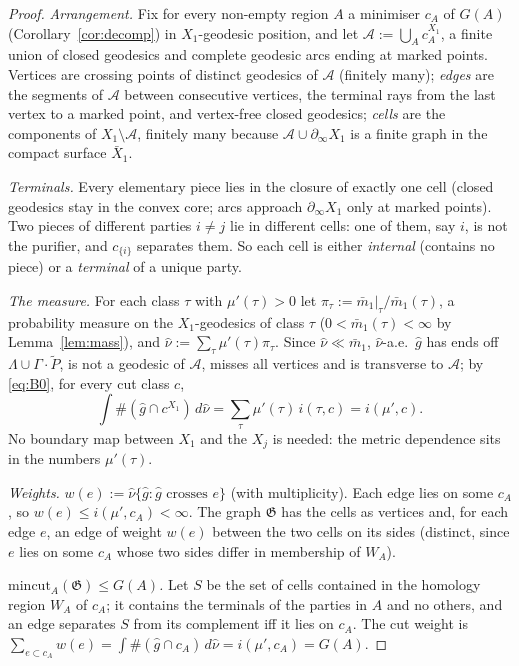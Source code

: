 \documentclass[aps,prd,onecolumn,superscriptaddress,nofootinbib,amsmath,amssymb,11pt]{revtex4-2}
\theoremstyle{definition}
\newcommand{\mbar}{\bar m}
\newcommand{\Pt}{\tilde P}
\begin{document}
\begin{proof}
\emph{Arrangement.} Fix for every non-empty region $A$ a minimiser $c_A$ of $G(A)$ (Corollary~\ref{cor:decomp}) in
$X_1$-geodesic position, and let $\mathcal A:=\bigcup_Ac_A^{X_1}$, a finite union of closed geodesics and complete
geodesic arcs ending at marked points. Vertices are crossing points of distinct geodesics of $\mathcal A$ (finitely
many); \emph{edges} are the segments of $\mathcal A$ between consecutive vertices, the terminal rays from the last
vertex to a marked point, and vertex-free closed geodesics; \emph{cells} are the components of $X_1\setminus\mathcal A$,
finitely many because $\mathcal A\cup\partial_\infty X_1$ is a finite graph in the compact surface $\bar X_1$.

\emph{Terminals.} Every elementary piece lies in the closure of exactly one cell (closed geodesics stay in the convex
core; arcs approach $\partial_\infty X_1$ only at marked points). Two pieces of different parties $i\ne j$ lie in
different cells: one of them, say $i$, is not the purifier, and $c_{\{i\}}$ separates them. So each cell is either
\emph{internal} (contains no piece) or a \emph{terminal} of a unique party.

\emph{The measure.} For each class $\tau$ with $\mu'(\tau)>0$ let $\pi_\tau:=\mbar_1|_\tau/\mbar_1(\tau)$, a probability
measure on the $X_1$-geodesics of class $\tau$ ($0<\mbar_1(\tau)<\infty$ by Lemma~\ref{lem:mass}), and
$\hat\nu:=\sum_\tau\mu'(\tau)\pi_\tau$. Since $\hat\nu\ll\mbar_1$, $\hat\nu$-a.e.\ $\hat g$ has ends off
$\Lambda\cup\Gamma\cdot\Pt$, is not a geodesic of $\mathcal A$, misses all vertices and is transverse to $\mathcal A$; by
\eqref{eq:B0}, for every cut class $c$,
\begin{equation}\label{eq:nuhat}
\int\#(\hat g\cap c^{X_1})\,d\hat\nu=\sum_\tau\mu'(\tau)\,i(\tau,c)=i(\mu',c).
\end{equation}
No boundary map between $X_1$ and the $X_j$ is needed: the metric dependence sits in the numbers $\mu'(\tau)$.

\emph{Weights.} $w(e):=\hat\nu\{\hat g:\hat g\text{ crosses }e\}$ (with multiplicity). Each edge lies on some $c_A$, so
$w(e)\le i(\mu',c_A)<\infty$. The graph $\mathfrak G$ has the cells as vertices and, for each edge $e$, an edge of weight
$w(e)$ between the two cells on its sides (distinct, since $e$ lies on some $c_A$ whose two sides differ in
membership of $W_A$).

\emph{$\mathrm{mincut}_A(\mathfrak G)\le G(A)$.} Let $S$ be the set of cells contained in the homology region $W_A$ of
$c_A$; it contains the terminals of the parties in $A$ and no others, and an edge separates $S$ from its complement
iff it lies on $c_A$. The cut weight is $\sum_{e\subset c_A}w(e)=\int\#(\hat g\cap c_A)\,d\hat\nu=i(\mu',c_A)=G(A)$.


\end{proof}
\end{document}
